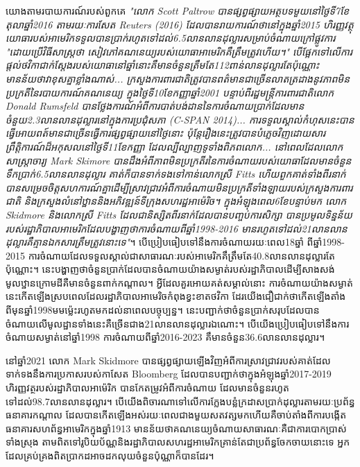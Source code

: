 \documentclass[10pt,twocolumn,letterpaper]{article}
\begin{document}
	យោងតាមរបាយការណ៍របស់ពួកគេ \textit{"លោក Scott Paltrow  បានផ្សព្វផ្សាយអត្ថបទមួយនៅថ្ងៃទី7ខែតុលាឆ្នាំ2016 តាមរយៈការសែត Reuters (2016) ដែលបានរាយការណ៍ថានៅក្នុងឆ្នាំ2015 ហិរញ្ញវត្ថុយោធារបស់អាមេរិកទទួលបានប្រាក់រហូតទៅដល់6.5លានលានដុល្លារសម្រាប់ចំណាយក្រៅផ្លូវការ "ដោយប្រើវិធីសាស្ត្រថា សៀវភៅគណនេយ្យរបស់យោធាអាមេរិកគឺត្រឹមត្រូវហើយ។" បើផ្អែកទៅលើការផ្តល់ថវិកាជាក់ស្តែងរបស់យោធានៅឆ្នាំនោះគឺមានចំនួនត្រឹមតែ112ពាន់លានដុល្លារតែប៉ុណ្ណោះ មានន័យថាវាខុសគ្នាខ្លាំងណាស់... ក្រសួងការពារជាតិត្រូវបានពត៌មានជាច្រើនលាតត្រដាងនូវភាពមិនប្រក្រតីនៃរបាយការណ៍គណនេយ្យ ក្នុងថ្ងៃទី10ខែកញ្ញាឆ្នាំ2001  បន្ទាប់ពីរដ្ឋមន្ត្រីការពារជាតិលោក Donald Rumsfeld បានថ្លែងការណ៍អំពីការបាត់បង់ដាននៃការចំណាយប្រាក់ដែលមានចំនួយ2.3លានលានដុល្លារនៅក្នុងការប្រជុំសភា (C-SPAN 2014)... ការទទួលស្គាល់កំហុសនេះបានធ្វើអោយពត៍មានជាច្រើនធ្វើការផ្សព្វផ្សាយនៅថ្ងៃនោះ ប៉ុន្តែរឿងនេះត្រូវបានបំភ្លេចវិញដោយសារព្រឹត្តិការណ៍ដ៏អកុសលនៅថ្ងៃទី11ខែកញ្ញា ដែលល្បីល្បាញទូទាំងពិភពលោក... នៅពេលដែលលោកសាស្រ្តាចារ្យ Mark Skimore បានដឹងអំពីភាពមិនប្រក្រតីរនៃការចំណាយរបស់យោធាដែលមានចំនួនទឹកប្រាក់6.5លានលានដុល្លារ គាត់ក៏បានទាក់ទងទៅកាន់លោកស្រី Fitts ហើយពួកគាត់ទាំងពីរនាក់បានសម្រេចចិត្តសហការណ៍គ្នាដើម្បីស្រាវជ្រាវអំពីការចំណាយមិនប្រក្រតីទាំងឡាយរបស់ក្រសួងការពារជាតិ និងក្រសួងលំនៅឋ្ឋាននិងអភិវឌ្ឍន៍ទីក្រុងសហរដ្ឋអាម៉េរិច។  ក្នុងអំឡុងពេល6ខែបន្ទាប់មក លោក Skidmore និងលោកស្រី Fitts ដែលជានិស្សិតពីរនាក់ដែលបានបញ្ចប់ការសិក្សា បានប្រមូលទិន្នន័យរបស់រដ្ឋាភិបាលអាមេរិកដែលបង្ហាញថាការចំណាយពីឆ្នាំ1998-2016 មានរហូតទៅដល់21លានលានដុល្លារគឺគ្មានឯកសារត្រឹមត្រូវនោះទេ"}\cite{12}។  បើប្រៀបធៀបទៅនឹងការចំណាយរយៈពេល18ឆ្នាំ ពីឆ្នាំ1998-2015 ការចំណាយដែលទទួលស្គាល់ជាសាធារណៈរបស់អាមេរិកគឹត្រឹមតែ40.8លានលានដុល្លារតែប៉ុណ្ណោះ\cite{15}។ នេះបង្ហាញថាចំនួនប្រាក់ដែលបានចំណាយយ៉ាងសម្ងាត់របស់រដ្ឋាភិបាលដើម្បីសាងសង់មូលឋ្ឋានក្រោមដីគឺមានចំនួនពាក់កណ្តាល។ អ្វីដែលគួរអោយគត់សម្គាល់នោះ ការចំណាយយ៉ាងសម្ងាត់នេះកើតឡើងស្របពេលដែលរដ្ឋាភិបាលអាមេរិចកំពុងខ្វះខាតថវិកា ដែរយើងជឿជាក់ថាកើតឡើងតាំងពីមុនឆ្នាំ1998មមម្ល៉េះរហូតមកដល់នាពេលបច្ចុប្បន្ន។ នេះបញ្ជាក់ថាចំនួនប្រាក់សរុបដែលបានចំណាយលើមូលដ្ឋានទាំងនេះគឺច្រើនជាង21លានលានដុល្លារឯណោះ។ បើយើងប្រៀបធៀបទៅនឹងការចំណាយសម្ងាត់នៅឆ្នាំ1998 ការចំណាយពីឆ្នាំ2016-2023 គឹមានចំនួន36.6លានលានដុល្លារ។

	នៅឆ្នាំ2021 លោក Mark Skidmore បានផ្សព្វផ្សាយឡើងវិញអំពីការស្រាវជ្រាវរបស់គាត់ដែលទាក់ទងនឹងការប្រកាសរបស់កាសែត Bloomberg ដែលបានបញ្ជាក់ថាក្នុងអំឡុងឆ្នាំ2017-2019 ហិរញ្ញវត្ថរបស់រដ្ឋាភិបាលអាម៉េរិក បានកែតម្រូវអំពីការចំណាយ ដែលមានចំនួនរហូតទៅដល់98.7លានលានដុល្លារ\cite{17,18}។ បើយើងពិចារណាទៅលើការក្លែងបន្លំក្រដាសប្រាក់ដុល្លារតាមរយៈប្រព័ន្ធធនាគារកណ្តាល ដែលបានកើតឡើងអស់រយៈពេលជាងមួយសតវត្សមកហើយគឺចាប់តាំងពីការបង្កើតធនាគារសហព័ន្ធអាមេរិកក្នុងឆ្នាំ1913\cite{37} មានន័យថាគណនេយ្យចំណាយសាធារណៈគឺជាការបោកប្រាស់ទាំងស្រុង តាមពិតទៅរូបិយប័ណ្ណនិងរដ្ឋាភិបាលសហរដ្ឋអាមេរិកគ្រាន់តែជាប្រព័ន្ធចែកចាយនោះទេ អ្នកដែលគ្រប់គ្រងពិតប្រាកដអាចដកលុយចំនួនប៉ុណ្ណាក៏បានដែរ។
    
\end{document}

